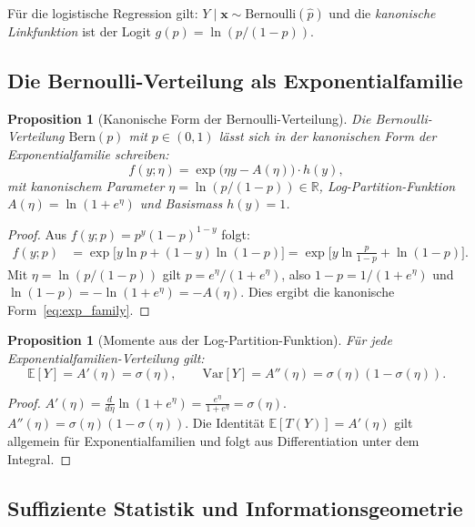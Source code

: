 ﻿\documentclass[12pt, a4paper]{article}
\newtheorem{proposition}[theorem]{Proposition}
\theoremstyle{definition}
\theoremstyle{remark}
\newcommand{\R}{\mathbb{R}}
\newcommand{\E}{\mathbb{E}}
\newcommand{\sigmoid}{\sigma}
\newcommand{\vx}{\bm{x}}
\begin{document}
Für die logistische Regression gilt: $Y\mid\vx \sim \mathrm{Bernoulli}(\hat{p})$ und die
\emph{kanonische Linkfunktion} ist der Logit $g(p) = \ln(p/(1-p))$.

\subsection{Die Bernoulli-Verteilung als Exponentialfamilie}

\begin{proposition}[Kanonische Form der Bernoulli-Verteilung]
  Die Bernoulli-Verteilung $\mathrm{Bern}(p)$ mit $p \in (0,1)$ lässt sich in der kanonischen
  Form der Exponentialfamilie schreiben:
  \begin{equation}
    f(y;\eta) = \exp\!\bigl(\eta y - A(\eta)\bigr) \cdot h(y),
    \label{eq:exp_family}
  \end{equation}
  mit kanonischem Parameter $\eta = \ln(p/(1-p)) \in \R$, Log-Partition-Funktion
  $A(\eta) = \ln(1+e^\eta)$ und Basismass $h(y) = 1$.
\end{proposition}

\begin{proof}
  Aus $f(y;p) = p^y(1-p)^{1-y}$ folgt:
  \begin{align*}
    f(y;p) &= \exp\!\bigl[y\ln p + (1-y)\ln(1-p)\bigr]
            = \exp\!\bigl[y\ln\tfrac{p}{1-p} + \ln(1-p)\bigr].
  \end{align*}
  Mit $\eta = \ln(p/(1-p))$ gilt $p = e^\eta/(1+e^\eta)$, also $1-p = 1/(1+e^\eta)$ und
  $\ln(1-p) = -\ln(1+e^\eta) = -A(\eta)$. Dies ergibt die kanonische Form~\eqref{eq:exp_family}. 
\end{proof}

\begin{proposition}[Momente aus der Log-Partition-Funktion]
  Für jede Exponentialfamilien-Verteilung gilt:
  \[
    \E[Y] = A'(\eta) = \sigmoid(\eta), \qquad \mathrm{Var}[Y] = A''(\eta) = \sigmoid(\eta)(1-\sigmoid(\eta)).
  \]
\end{proposition}

\begin{proof}
  $A'(\eta) = \frac{d}{d\eta}\ln(1+e^\eta) = \frac{e^\eta}{1+e^\eta} = \sigmoid(\eta)$.
  $A''(\eta) = \sigmoid(\eta)(1-\sigmoid(\eta))$. Die Identität $\E[T(Y)] = A'(\eta)$ gilt
  allgemein für Exponentialfamilien und folgt aus Differentiation unter dem Integral. 
\end{proof}

\subsection{Suffiziente Statistik und Informationsgeometrie}
\end{document}
